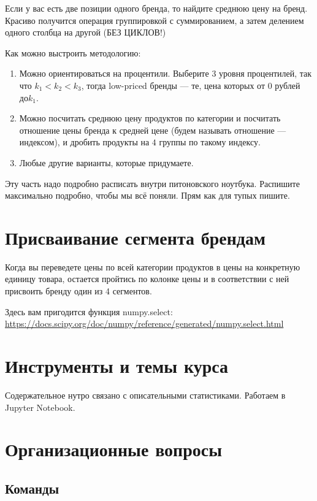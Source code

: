 \documentclass[12pt, a4paper, oneside]{article}
\begin{document}
Если у вас есть две позиции одного бренда, то найдите среднюю цену на бренд. Красиво получится операция группировкой с суммированием, а затем делением одного столбца на другой (БЕЗ ЦИКЛОВ!)

Как можно выстроить методологию:

\begin{enumerate}
	\item Можно ориентироваться на процентили. Выберите $3$ уровня процентилей, так что  $k_1 < k_2 < k_3$, тогда low-priced бренды --- те, цена которых от $0$ рублей $до k_1$.
	
	\item Можно посчитать среднюю цену продуктов по категории и посчитать отношение цены бренда к средней цене (будем называть отношение ---индексом), и дробить продукты на $4$ группы по такому индексу.
	
	\item Любые другие варианты, которые придумаете.
\end{enumerate}

Эту часть надо подробно расписать внутри питоновского ноутбука. Распишите максимально подробно, чтобы мы всё поняли. Прям как для тупых пишите. 

\section{Присваивание сегмента брендам}	

Когда вы переведете цены по всей категории продуктов в цены на конкретную единицу товара, остается пройтись по колонке цены и в соответствии с ней присвоить бренду один из 4 сегментов. 

Здесь вам пригодится функция numpy.select: \url{https://docs.scipy.org/doc/numpy/reference/generated/numpy.select.html}


\section{Инструменты и темы курса}		

Содержательное нутро связано с описательными статистиками. Работаем в Jupyter Notebook.

\section{Организационные вопросы}		

\subsection*{Команды}
\end{document}
